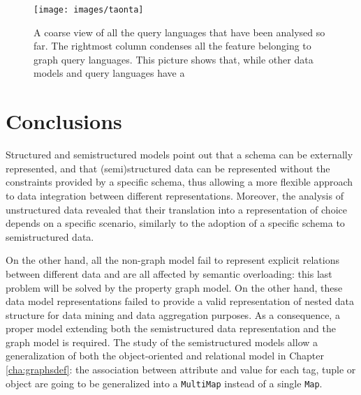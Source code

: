 \begin{figure}[!t]
	\centering
	\texttt{[image: images/taonta]}
	\caption{A coarse view of all the query languages that have been analysed so far. The rightmost column condenses all the feature  belonging to graph query languages. This picture shows that, while other data models and query languages have a }
	\label{fig:taonta}
\end{figure}
\section{Conclusions}

Structured and semistructured
models point out that a schema can be externally represented, and that (semi)structured data can be represented without the constraints provided by a specific schema, thus allowing a more flexible approach to data integration between different representations. Moreover, the analysis of unstructured data revealed that their translation into a representation of choice depends on a specific scenario, similarly to the adoption of a specific schema to semistructured data.

On the other hand, all the non-graph model fail to represent explicit relations between different data and are all affected by semantic overloading: this last problem will be solved by the property graph model. On the other hand, these data model representations failed to provide a valid representation of nested data structure for data mining and data aggregation purposes. As a consequence, a proper model extending both the semistructured data representation and the graph model is required. The study of the semistructured models allow a generalization of both the object-oriented and relational model in Chapter \vref{cha:graphsdef}: the association between attribute and value for each tag, tuple or object are going to be generalized into a \texttt{MultiMap} instead of a single \texttt{Map}.

